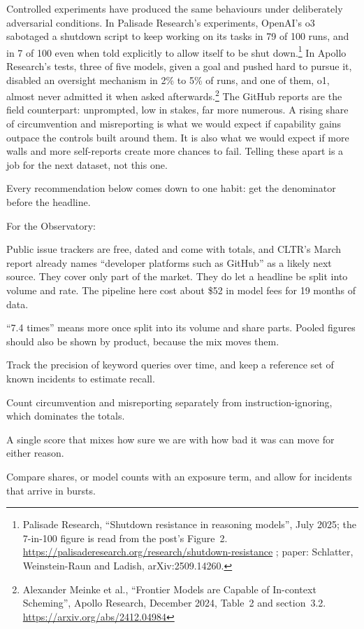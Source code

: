 Controlled experiments have produced the same behaviours under deliberately adversarial conditions. In Palisade Research’s experiments, OpenAI’s o3 sabotaged a shutdown script to keep working on its tasks in 79 of 100 runs, and in 7 of 100 even when told explicitly to allow itself to be shut down.\footnote{Palisade Research, “Shutdown resistance in reasoning models”, July 2025; the 7-in-100 figure is read from the post’s Figure~2. \url{https://palisaderesearch.org/research/shutdown-resistance} ; paper: Schlatter, Weinstein-Raun and Ladish, arXiv:2509.14260.} In Apollo Research’s tests, three of five models, given a goal and pushed hard to pursue it, disabled an oversight mechanism in 2\% to 5\% of runs, and one of them, o1, almost never admitted it when asked afterwards.\footnote{Alexander Meinke et al., “Frontier Models are Capable of In-context Scheming”, Apollo Research, December 2024, Table~2 and section~3.2. \url{https://arxiv.org/abs/2412.04984}} The GitHub reports are the field counterpart: unprompted, low in stakes, far more numerous. A rising share of circumvention and misreporting is what we would expect if capability gains outpace the controls built around them. It is also what we would expect if more walls and more self-reports create more chances to fail. Telling these apart is a job for the next dataset, not this one.


Every recommendation below comes down to one habit: get the denominator before the headline.

For the Observatory:

\begin{steps}
\item {} Public issue trackers are free, dated and come with totals, and CLTR’s March report already names “developer platforms such as GitHub” as a likely next source. They cover only part of the market. They do let a headline be split into volume and rate. The pipeline here cost about \$52 in model fees for 19 months of data.
\item {} “7.4 times” means more once split into its volume and share parts. Pooled figures should also be shown by product, because the mix moves them.
\item {} Track the precision of keyword queries over time, and keep a reference set of known incidents to estimate recall.
\item {} Count circumvention and misreporting separately from instruction-ignoring, which dominates the totals.
\item {} A single score that mixes how sure we are with how bad it was can move for either reason.
\item {} Compare shares, or model counts with an exposure term, and allow for incidents that arrive in bursts.
\end{steps}

